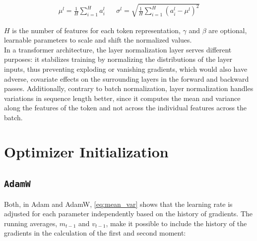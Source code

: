 \documentclass{article}
\begin{document}
\begin{align}
	\mu^l = \frac{1}{H} \sum_{i=1}^H a_i^l &   & \sigma^l = \sqrt{\frac{1}{H}\sum_{i=1}^H (a_i^l - \mu^l)^2} 
\end{align}

\(H\) is the number of features for each token representation, \(\gamma\) and \(\beta\) are optional, learnable parameters to scale and shift the normalized values. \\
In a transformer architecture, the layer normalization layer serves different purposes: it stabilizes training by normalizing the distributions of the layer inputs, thus preventing exploding or vanishing gradients, which would also have adverse, covariate effects on the surrounding layers in the forward and backward passes.
Additionally, contrary to batch normalization, layer normalization handles variations in sequence length better, since it computes the mean and variance along the features of the token and not across the individual features across the batch.


\section{Optimizer Initialization}
\subsection{\texttt{AdamW}}
Both, in Adam and AdamW, \cref{eq:mean_var} shows that the learning rate is adjusted for each parameter independently based on the history of gradients. The running averages, \(m_{t-1}\) and \(v_{t-1}\), make it possible to include the history of the gradients in the calculation of the first and second moment:
\end{document}
